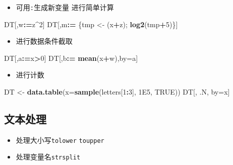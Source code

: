 \documentclass[]{book}
\newenvironment{Shaded}{\begin{snugshade}}{\end{snugshade}}
\newcommand{\DataTypeTok}[1]{\textcolor[rgb]{0.13,0.29,0.53}{#1}}
\newcommand{\DecValTok}[1]{\textcolor[rgb]{0.00,0.00,0.81}{#1}}
\newcommand{\ErrorTok}[1]{\textcolor[rgb]{0.64,0.00,0.00}{\textbf{#1}}}
\newcommand{\FloatTok}[1]{\textcolor[rgb]{0.00,0.00,0.81}{#1}}
\newcommand{\KeywordTok}[1]{\textcolor[rgb]{0.13,0.29,0.53}{\textbf{#1}}}
\newcommand{\NormalTok}[1]{#1}
\newcommand{\OperatorTok}[1]{\textcolor[rgb]{0.81,0.36,0.00}{\textbf{#1}}}
\newcommand{\OtherTok}[1]{\textcolor[rgb]{0.56,0.35,0.01}{#1}}
\newcommand{\StringTok}[1]{\textcolor[rgb]{0.31,0.60,0.02}{#1}}
\providecommand{\tightlist}{%
  \setlength{\itemsep}{0pt}\setlength{\parskip}{0pt}}
\begin{document}
\begin{itemize}
\tightlist
\item
  可用\texttt{:}生成新变量 进行简单计算
\end{itemize}

\begin{Shaded}
\begin{Highlighting}[]
\NormalTok{DT[,w}\OperatorTok{:}\ErrorTok{=}\NormalTok{z}\OperatorTok{^}\DecValTok{2}\NormalTok{]}
\NormalTok{DT[,m}\OperatorTok{:}\ErrorTok{=}\StringTok{ }\NormalTok{\{tmp <-}\StringTok{ }\NormalTok{(x}\OperatorTok{+}\NormalTok{z); }\KeywordTok{log2}\NormalTok{(tmp}\OperatorTok{+}\DecValTok{5}\NormalTok{)\}]}
\end{Highlighting}
\end{Shaded}

\begin{itemize}
\tightlist
\item
  进行数据条件截取
\end{itemize}

\begin{Shaded}
\begin{Highlighting}[]
\NormalTok{DT[,a}\OperatorTok{:}\ErrorTok{=}\NormalTok{x}\OperatorTok{>}\DecValTok{0}\NormalTok{]}
\NormalTok{DT[,b}\OperatorTok{:}\ErrorTok{=}\StringTok{ }\KeywordTok{mean}\NormalTok{(x}\OperatorTok{+}\NormalTok{w),by=a]}
\end{Highlighting}
\end{Shaded}

\begin{itemize}
\tightlist
\item
  进行计数
\end{itemize}

\begin{Shaded}
\begin{Highlighting}[]
\NormalTok{DT <-}\StringTok{ }\KeywordTok{data.table}\NormalTok{(}\DataTypeTok{x=}\KeywordTok{sample}\NormalTok{(letters[}\DecValTok{1}\OperatorTok{:}\DecValTok{3}\NormalTok{], }\FloatTok{1E5}\NormalTok{, }\OtherTok{TRUE}\NormalTok{))}
\NormalTok{DT[, .N, by=x]}
\end{Highlighting}
\end{Shaded}

\subsection{文本处理}

\begin{itemize}
\tightlist
\item
  处理大小写\texttt{tolower} \texttt{toupper}
\item
  处理变量名\texttt{strsplit}
\end{itemize}
\end{document}
